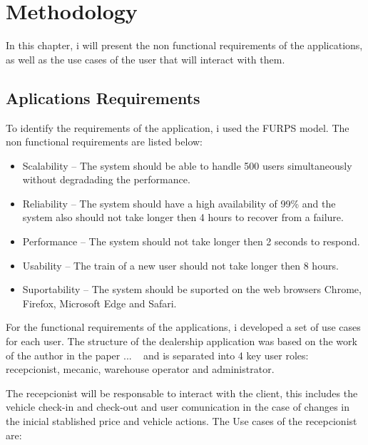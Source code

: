 \chapter{Methodology}%
\label{chapter:methodology}

\begin{introduction}
In this chapter, i will present the non functional requirements of the applications, as well as the use cases of the user that will interact with them. 
\end{introduction} 




\section{Aplications Requirements} 


To identify the requirements of the application, i used the FURPS model. 
The non functional requirements are listed below:

\begin{itemize}
  \item Scalability – The system should be able to handle 500 users simultaneously without degradading the performance.
  \item Reliability – The system should have a high availability of 99\% and the system also should not take longer then 4 hours to recover from a failure.
  \item Performance – The system should not take longer then 2 seconds to respond.
  \item Usability – The train of a new user should not take longer then 8 hours.
  \item Suportability – The system should be suported on the web browsers Chrome, Firefox, Microsoft Edge and Safari.
\end{itemize}

For the functional requirements of the applications, i developed a set of use cases for each user.
The structure of the dealership application was based on the work of the author in the paper ... ~\cite{Setting_the_after_sale_process} and is separated into 4 key user roles: recepcionist, mecanic, warehouse operator and administrator.

The recepcionist will be responsable to interact with the client, this includes the vehicle check-in and check-out and user comunication in the case of changes in the inicial stablished price and vehicle actions. 
The Use cases of the recepcionist are:

